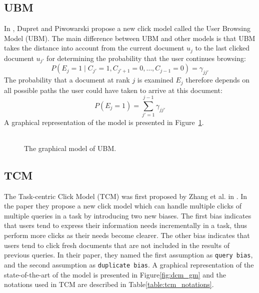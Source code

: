 \subsection{UBM}
In \cite{Dupret2008}, Dupret and Piwowarski propose a new click model called the User Browsing Model (UBM). The main difference between UBM and other models is that UBM takes the distance into account from the current document \(u_j\) to the last clicked document \(u_{j'}\) for determining the probability that the user continues browsing:
\[P(E_j =1 \mid C_{j'}=1, C_{j'+1}=0, \dots, C_{j-1}=0) = \gamma_{jj'}\]
The probability that a document at rank \(j\) is examined \(E_j\) therefore depends on all possible paths the user could have taken to arrive at this document:
\[P(E_j = 1) = \sum_{j'=1}^{j-1} \gamma_{jj'}\]
A graphical representation of the model is presented in Figure~\ref{fig:ubm_gm}.

\begin{figure}[ht!]
	\begin{center}
		\begin{tabular}{c}
			
		\end{tabular}
	\end{center}
	\caption{The graphical model of UBM.}	
	\label{fig:ubm_gm}
\end{figure}

\subsection{TCM}
The Task-centric Click Model (TCM) was first proposed by Zhang et al. in \cite{Zhang2011}. In the paper they propose a new click model which can handle multiple clicks of multiple queries in a task by introducing two new biases. The first bias indicates that users tend to express their information needs incrementally in a task, thus perform more clicks as their needs become clearer. The other bias indicates that users tend to click fresh documents that are not included in the results of previous queries. In their paper, they named the first assumption as \texttt{query bias}, and the second assumption as \texttt{duplicate bias}. A graphical representation of the state-of-the-art of the model is presented in Figure\ref{fig:dcm_gm} and the notations used in TCM are described in Table\ref{table:tcm_notations}. 

